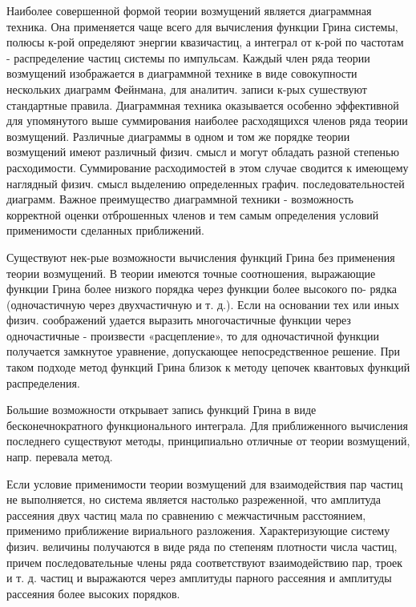 \documentclass[10pt]{article}
\begin{document}
Наиболее совершенной формой теории возмущений является диаграммная техника. Она применяется чаще всего для вычисления функции Грина системы, полюсы к-рой определяют энергии квазичастиц, а интеграл от к-рой по частотам - распределение частиц системы по импульсам. Каждый член ряда теории возмущений изображается в диаграммной технике в виде совокупности нескольких диаграмм Фейнмана, для аналитич. записи к-рых сушествуют стандартные правила. Диаграммная техника оказывается особенно эффективной для упомянутого выше суммирования наиболее расходящихся членов ряда теории возмущений. Различные диаграммы в одном и том же порядке теории возмущений имеют различный физич. смысл и могут обладать разной степенью расходимости. Суммирование расходимостей в этом случае сводится к имеющему наглядный физич. смысл выделению определенных графич. последовательностей диаграмм. Важное преимущество диаграммной техники - возможность корректной оценки отброшенных членов и тем самым определения условий применимости сделанных приближений.



Существуют нек-рые возможности вычисления функций Грина без применения теории возмущений. В теории имеются точные соотношения, выражающие функции Грина более низкого порядка через функции более высокого по- рядка (одночастичную через двухчастичную и т. д.). Если на основании тех или иных физич. соображений удается выразить многочастичные функции через одночастичные - произвести «расцепление», то для одночастичной функции получается замкнутое уравнение, допускающее непосредственное решение. При таком подходе метод функций Грина близок к методу цепочек квантовых функций распределения.



Большие возможности открывает запись функций Грина в виде бесконечнократного функционального интеграла. Для приближенного вычисления последнего существуют методы, принципиально отличные от теории возмущений, напр. перевала метод.



Если условие применимости теории возмущений для взаимодействия пар частиц не выполняется, но система является настолько разреженной, что амплитуда рассеяния двух частиц мала по сравнению с межчастичным расстоянием, применимо приближение вириального разложения. Характеризующие систему физич. величины получаются в виде ряда по степеням плотности числа частиц, причем последовательные члены ряда соответствуют взаимодействию пар, троек и т. д. частиц и выражаются через амплитуды парного рассеяния и амплитуды рассеяния более высоких порядков.
\end{document}
